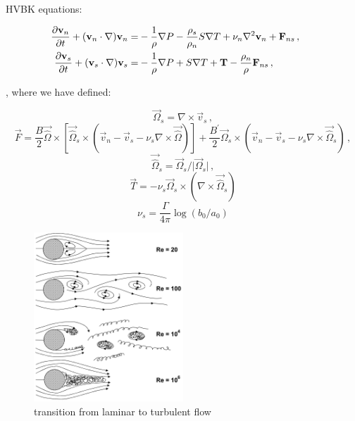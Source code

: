 HVBK equations:

\begin{align}
\frac{\partial\vec{v}_n}{\partial t} + (\vec{v}_n\cdot \nabla)\vec{v}_n =& -\frac{1}{\rho} \nabla P - \frac{\rho_s}{\rho_n} S \nabla T + \nu_n \nabla^2 \vec{v}_n + \vec{F}_{ns}\,,
\label{motion_normal}\\
\frac{\partial\vec{v}_s}{\partial t} + (\vec{v}_s\cdot \nabla)\vec{v}_s =& -\frac{1}{\rho} \nabla P + S \nabla T + \vec{T} - \frac{\rho_n}{\rho} \vec{F}_{ns}\,,
\hspace{15mm}
\label{motion_super}
\end{align}

, where we have defined:

\begin{equation}
\vec{\Omega}_s = \nabla \times \vec{v}_s\,,
\end{equation}
\begin{equation}
\vec{F} = \frac{B}{2} \vec{\hat{\Omega}} \times [\vec{\hat{\Omega}}_s \times (\vec{v}_n - \vec{v}_s - \nu_s\nabla \times \vec{\hat{\Omega}})]
+ \frac{B^{\prime}}{2} \vec{\Omega}_s \times (\vec{v}_n - \vec{v}_s - \nu_s\nabla \times \vec{\hat{\Omega}}_s)\,,
\end{equation}
\begin{equation}
\vec{\hat{\Omega}}_s = \vec{\Omega}_s / \vert \vec{\Omega}_s \vert\,,
\end{equation}
\begin{equation}
\vec{T} = -\nu_s \vec{\Omega}_s \times (\nabla \times \vec{\hat{\Omega}}_s)
\end{equation}
\begin{equation}
\nu_s = \frac{\Gamma}{4\pi} \log(b_0 / a_0)
\end{equation}

\begin{figure}[h]
	\centering
	\includegraphics[width=0.5\textwidth]{graphics/theory/laminar-turbulent}
	\caption{transition from laminar to turbulent flow}
	\label{laminar-turbulent}
\end{figure}

